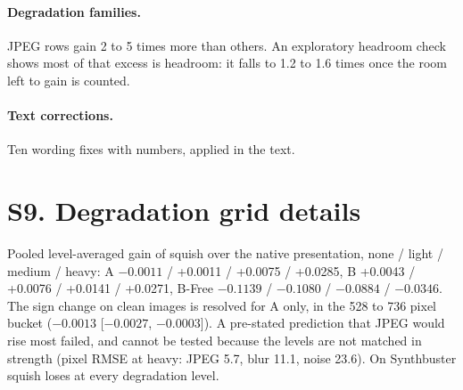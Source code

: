 \documentclass[10pt]{article}
\begin{document}
\paragraph{Degradation families.} JPEG rows gain 2 to 5 times more
than others. An exploratory headroom check shows most of that excess is
headroom: it falls to 1.2 to 1.6 times once the room left to gain is counted.

\paragraph{Text corrections.} Ten wording fixes with numbers,
applied in the text.

\section*{S9. Degradation grid details}

Pooled level-averaged gain of squish over the native presentation, none /
light / medium / heavy: A $-0.0011$ / +0.0011 / +0.0075 / +0.0285, B +0.0043
/ +0.0076 / +0.0141 / +0.0271, B-Free $-0.1139$ / $-0.1080$ / $-0.0884$ /
$-0.0346$. The sign change on clean images is resolved for A only, in the
528 to 736 pixel bucket ($-0.0013$ [$-0.0027$, $-0.0003$]). A pre-stated
prediction that JPEG would rise most failed, and cannot be tested because the
levels are not matched in strength (pixel RMSE at heavy: JPEG 5.7, blur 11.1,
noise 23.6). On Synthbuster squish loses at every degradation level.
\end{document}
